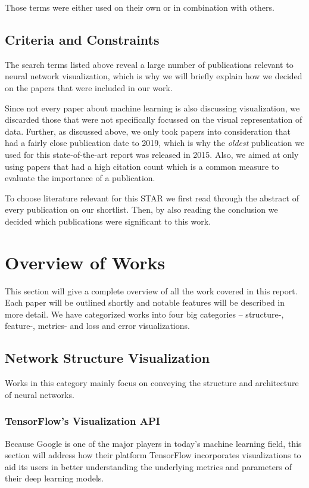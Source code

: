 \documentclass{acmsiggraph}               %
\begin{document}
Those terms were either used on their own or in combination with others.

\subsection{Criteria and Constraints}
The search terms listed above reveal a large number of publications relevant to neural network visualization, which is why we will briefly explain how we decided on the papers that were included in our work.

Since not every paper about machine learning is also discussing visualization, we discarded those that were not specifically focussed on the visual representation of data. Further, as discussed above, we only took papers into consideration that had a fairly close publication date to 2019, which is why the \textit{oldest} publication we used for this state-of-the-art report was released in 2015. Also, we aimed at only using papers that had a high citation count which is a common measure to evaluate the importance of a publication.

To choose literature relevant for this STAR we first read through the abstract of every publication on our shortlist. Then, by also reading the conclusion we decided which publications were significant to this work.

\section{Overview of Works}
This section will give a complete overview of all the work covered in this report. Each paper will be outlined shortly and notable features will be described in more detail. We have categorized works into four big categories -- structure-, feature-, metrics- and loss and error visualizations.

\subsection{Network Structure Visualization}
Works in this category mainly focus on conveying the structure and architecture of neural networks.

\subsubsection{TensorFlow's Visualization API}
Because Google is one of the major players in today's machine learning field, this section will address how their platform TensorFlow incorporates visualizations to aid its users in better understanding the underlying metrics and parameters of their deep learning models.
\end{document}
